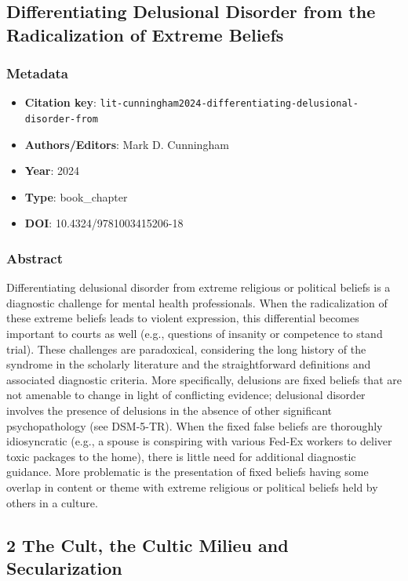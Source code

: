 \subsection{Differentiating Delusional Disorder from the Radicalization of Extreme Beliefs}\label{lit:lit-cunningham2024-differentiating-delusional-disorder-from}
\subsubsection*{Metadata}
\begin{itemize}
  \item \textbf{Citation key}: \texttt{lit-cunningham2024-differentiating-delusional-disorder-from}
  \item \textbf{Authors/Editors}: Mark D. Cunningham
  \item \textbf{Year}: 2024
  \item \textbf{Type}: book\_chapter
  \item \textbf{DOI}: 10.4324/9781003415206-18
\end{itemize}
\subsubsection*{Abstract}
Differentiating delusional disorder from extreme religious or political beliefs is a diagnostic challenge for mental health professionals. When the radicalization of these extreme beliefs leads to violent expression, this differential becomes important to courts as well (e.g., questions of insanity or competence to stand trial). These challenges are paradoxical, considering the long history of the syndrome in the scholarly literature and the straightforward definitions and associated diagnostic criteria. More specifically, delusions are fixed beliefs that are not amenable to change in light of conflicting evidence; delusional disorder involves the presence of delusions in the absence of other significant psychopathology (see DSM-5-TR). When the fixed false beliefs are thoroughly idiosyncratic (e.g., a spouse is conspiring with various Fed-Ex workers to deliver toxic packages to the home), there is little need for additional diagnostic guidance. More problematic is the presentation of fixed beliefs having some overlap in content or theme with extreme religious or political beliefs held by others in a culture.

\subsection{2 The Cult, the Cultic Milieu and Secularization}\label{lit:lit-kaplan2002-2-the-cult-the}

